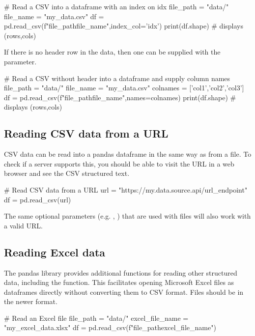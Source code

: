 \begin{pycode}
    # Read a CSV into a dataframe with an index on idx
    file_path = "data/"
    file_name = "my_data.csv"
    df = pd.read_csv(f"{file_path}{file_name}",index_col='idx')
    print(df.shape) # displays (rows,cols)
\end{pycode}

\newpage
If there is no header row in the data, then one can be supplied with the  parameter.

\begin{pycode}
    # Read a CSV without header into a dataframe and supply column names
    file_path = "data/"
    file_name = "my_data.csv"
    colnames = ['col1','col2','col3']
    df = pd.read_csv(f"{file_path}{file_name}",names=colnames)
    print(df.shape) # displays (rows,cols)
\end{pycode}


\subsection{Reading CSV data from a URL}

CSV data can be read into a pandas dataframe in the same way as from a file. To check if a server supports this, you should be able to visit the URL in a web browser and see the CSV structured text.

\begin{pycode}
    # Read CSV data from a URL
    url =  "https://my.data.source.api/url_endpoint"
    df = pd.read_csv(url)
\end{pycode}

The same optional parameters (e.g. , ) that are used with files will also work with a valid URL.

\subsection{Reading Excel data}

The pandas library provides additional functions for reading other structured data, including the  function. This facilitates opening Microsoft Excel files as dataframes directly without converting them to CSV format. Files should be in the newer  format.

\begin{pycode}
    # Read an Excel file
    file_path = "data/"
    excel_file_name = "my_excel_data.xlsx"
    df = pd.read_csv(f"{file_path}{excel_file_name}")
\end{pycode}

